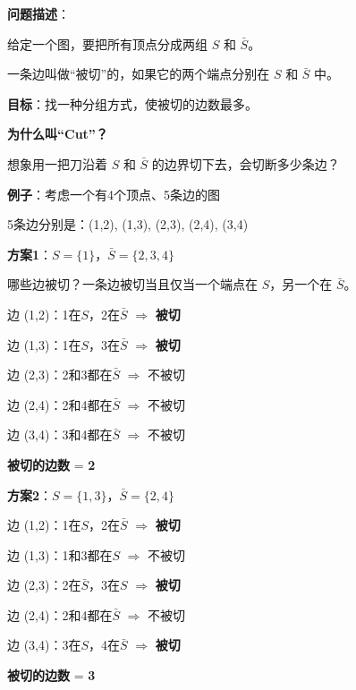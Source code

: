 \documentclass[12pt, a4paper]{ctexart}
\begin{document}
\begin{blackboard}

\textbf{问题描述}：

给定一个图，要把所有顶点分成两组 $S$ 和 $\bar{S}$。

一条边叫做``被切''的，如果它的两个端点分别在 $S$ 和 $\bar{S}$ 中。

\textbf{目标}：找一种分组方式，使被切的边数最多。

\textbf{为什么叫``Cut''？}

想象用一把刀沿着 $S$ 和 $\bar{S}$ 的边界切下去，会切断多少条边？

\textbf{例子}：考虑一个有4个顶点、5条边的图

\begin{center}
\end{center}

5条边分别是：(1,2), (1,3), (2,3), (2,4), (3,4)

\end{blackboard}

\begin{blackboard}[枚举一些分组方案]

\textbf{方案1}：$S = \{1\}$，$\bar{S} = \{2, 3, 4\}$

哪些边被切？一条边被切当且仅当一个端点在 $S$，另一个在 $\bar{S}$。

边 (1,2)：1在$S$，2在$\bar{S}$ $\Rightarrow$ \textbf{被切} \checkmark

边 (1,3)：1在$S$，3在$\bar{S}$ $\Rightarrow$ \textbf{被切} \checkmark

边 (2,3)：2和3都在$\bar{S}$ $\Rightarrow$ 不被切

边 (2,4)：2和4都在$\bar{S}$ $\Rightarrow$ 不被切

边 (3,4)：3和4都在$\bar{S}$ $\Rightarrow$ 不被切

\textbf{被切的边数} = \textbf{2}

\textbf{方案2}：$S = \{1, 3\}$，$\bar{S} = \{2, 4\}$

边 (1,2)：1在$S$，2在$\bar{S}$ $\Rightarrow$ \textbf{被切} \checkmark

边 (1,3)：1和3都在$S$ $\Rightarrow$ 不被切

边 (2,3)：2在$\bar{S}$，3在$S$ $\Rightarrow$ \textbf{被切} \checkmark

边 (2,4)：2和4都在$\bar{S}$ $\Rightarrow$ 不被切

边 (3,4)：3在$S$，4在$\bar{S}$ $\Rightarrow$ \textbf{被切} \checkmark

\textbf{被切的边数} = \textbf{3}

\end{blackboard}
\end{document}
